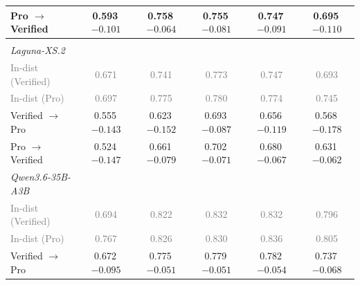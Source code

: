 \begin{table}[t]
\begin{tabular}{lccccc}
\qquad{}Pro $\rightarrow$ Verified & 0.593\,{\scriptsize \textcolor{red!70!black}{$-0.101$}} & 0.758\,{\scriptsize \textcolor{red!70!black}{$-0.064$}} & 0.755\,{\scriptsize \textcolor{red!70!black}{$-0.081$}} & 0.747\,{\scriptsize \textcolor{red!70!black}{$-0.091$}} & 0.695\,{\scriptsize \textcolor{red!70!black}{$-0.110$}}  \\
\midrule
\multicolumn{6}{l}{\textit{\RedFail{}}} \\
\quad{}\textit{Laguna-XS.2} \\
\qquad{}\textcolor{gray}{\small In-dist (Verified)} & \textcolor{gray}{\small 0.671} & \textcolor{gray}{\small 0.741} & \textcolor{gray}{\small 0.773} & \textcolor{gray}{\small 0.747} & \textcolor{gray}{\small 0.693} \\
\qquad{}\textcolor{gray}{\small In-dist (Pro)} & \textcolor{gray}{\small 0.697} & \textcolor{gray}{\small 0.775} & \textcolor{gray}{\small 0.780} & \textcolor{gray}{\small 0.774} & \textcolor{gray}{\small 0.745} \\
\qquad{}Verified $\rightarrow$ Pro & 0.555\,{\scriptsize \textcolor{red!70!black}{$-0.143$}} & 0.623\,{\scriptsize \textcolor{red!70!black}{$-0.152$}} & 0.693\,{\scriptsize \textcolor{red!70!black}{$-0.087$}} & 0.656\,{\scriptsize \textcolor{red!70!black}{$-0.119$}} & 0.568\,{\scriptsize \textcolor{red!70!black}{$-0.178$}}  \\
\qquad{}Pro $\rightarrow$ Verified & 0.524\,{\scriptsize \textcolor{red!70!black}{$-0.147$}} & 0.661\,{\scriptsize \textcolor{red!70!black}{$-0.079$}} & 0.702\,{\scriptsize \textcolor{red!70!black}{$-0.071$}} & 0.680\,{\scriptsize \textcolor{red!70!black}{$-0.067$}} & 0.631\,{\scriptsize \textcolor{red!70!black}{$-0.062$}}  \\
\quad{}\textit{Qwen3.6-35B-A3B} \\
\qquad{}\textcolor{gray}{\small In-dist (Verified)} & \textcolor{gray}{\small 0.694} & \textcolor{gray}{\small 0.822} & \textcolor{gray}{\small 0.832} & \textcolor{gray}{\small 0.832} & \textcolor{gray}{\small 0.796} \\
\qquad{}\textcolor{gray}{\small In-dist (Pro)} & \textcolor{gray}{\small 0.767} & \textcolor{gray}{\small 0.826} & \textcolor{gray}{\small 0.830} & \textcolor{gray}{\small 0.836} & \textcolor{gray}{\small 0.805} \\
\qquad{}Verified $\rightarrow$ Pro & 0.672\,{\scriptsize \textcolor{red!70!black}{$-0.095$}} & 0.775\,{\scriptsize \textcolor{red!70!black}{$-0.051$}} & 0.779\,{\scriptsize \textcolor{red!70!black}{$-0.051$}} & 0.782\,{\scriptsize \textcolor{red!70!black}{$-0.054$}} & 0.737\,{\scriptsize \textcolor{red!70!black}{$-0.068$}}  \\

\end{tabular}
\end{table}

